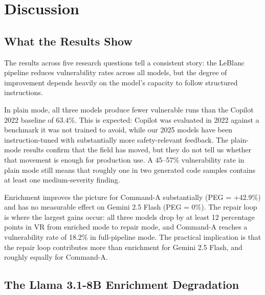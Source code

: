 \documentclass[12pt,a4paper]{report}
\begin{document}
\setcounter{page}{31}
\setcounter{chapter}{5}   %

\chapter{Discussion}
\label{ch:discussion}

\section{What the Results Show}
\label{sec:discmain}

The results across five research questions tell a consistent story: the LeBlanc
pipeline reduces vulnerability rates across all models, but the degree of
improvement depends heavily on the model's capacity to follow structured
instructions.

In plain mode, all three models produce fewer vulnerable runs than the Copilot
2022 baseline of 63.4\%. This is expected: Copilot was evaluated in 2022 against
a benchmark it was not trained to avoid, while our 2025 models have been
instruction-tuned with substantially more safety-relevant feedback. The
plain-mode results confirm that the field has moved, but they do not tell us
whether that movement is enough for production use. A 45--57\% vulnerability rate
in plain mode still means that roughly one in two generated code samples contains
at least one medium-severity finding.

Enrichment improves the picture for Command-A substantially (PEG = +42.9\%) and
has no measurable effect on Gemini 2.5 Flash (PEG = 0\%). The repair loop
is where the largest gains occur: all three models drop by at least 12 percentage
points in VR from enriched mode to repair mode, and Command-A reaches a
vulnerability rate of 18.2\% in full-pipeline mode. The practical implication
is that the repair loop contributes more than enrichment for Gemini 2.5 Flash,
and roughly equally for Command-A.

\section{The Llama 3.1-8B Enrichment Degradation}
\label{sec:llamadeg}
\end{document}

